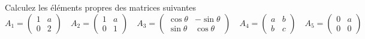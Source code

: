 \begin{exercice}
	\label{ex:eigs2x2}
	Calculez les éléments propres des matrices suivantes
	\[
		A_1\!=\!\begin{pmatrix}1&a\\0&2\end{pmatrix}
		\quad
		A_2\!=\!\begin{pmatrix}1&a\\0&1\end{pmatrix}
		\quad
		A_3\!=\!\begin{pmatrix}\cos\theta&-\sin\theta\\\sin\theta&\cos\theta\end{pmatrix}
		\quad
		A_4\!=\!\begin{pmatrix}a&b\\b&c\end{pmatrix}
		\quad
		A_5\!=\!\begin{pmatrix}0&a\\0&0\end{pmatrix}
	\]
\end{exercice}
